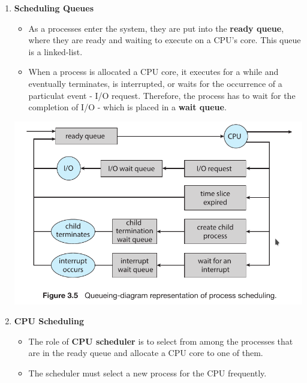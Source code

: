 \documentclass[10pt]{article}
\begin{document}
\begin{enumerate}
	\item \textbf{Scheduling Queues}
	\begin{itemize}
		\item As a processes enter the system, they are put into the \textbf{ready queue}, where they are ready and waiting to execute on a CPU's core. This queue is a linked-list.
		\item When a process is allocated a CPU core, it executes for a while and eventually terminates, is interrupted, or waits for the occurrence of a particulat event - I/O request. Therefore, the process has to wait for the completion of I/O - which is placed in a \textbf{wait queue}. 
	\end{itemize}

	\includegraphics[scale=0.6]{Queueing-diagram.png}
	\\
	\bigbreak

	\item \textbf{CPU Scheduling}
	\begin{itemize}
		\item The role of \textbf{CPU scheduler} is to select from among the processes that are in the ready queue and allocate a CPU core to one of them.
		\item The scheduler must select a new process for the CPU frequently.
	\end{itemize}
\end{enumerate}
\end{document}
